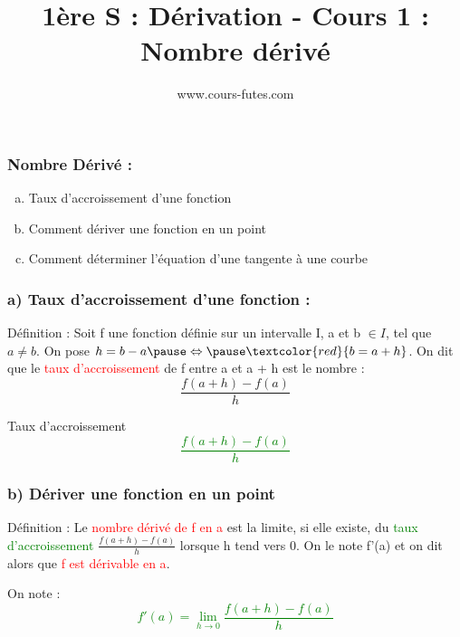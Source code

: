 \documentclass[t]{beamer}
\title{1ère S : Dérivation - Cours 1 : Nombre dérivé}
\author{www.cours-futes.com}
\institute{Sébastien Harinck}
\date{}
\begin{document}
\begin{frame}
\titlepage
\end{frame}

\begin{frame}[label=pagebanale]
\frametitle{Nombre Dérivé :}
\pause
\begin{enumerate}[a)]
\item<+-> Taux d'accroissement d'une fonction
\item<+-> Comment dériver une fonction en un point
\item<+-> Comment déterminer l'équation d'une tangente à une courbe
\end{enumerate}
\end{frame}

\begin{frame}[label=pagebanale]
\frametitle{a)  Taux d'accroissement d'une fonction : }
\pause
\begin{block}{Définition :}
\pause
Soit f une fonction définie sur un intervalle I, \pause a et b $ \in I$, \pause tel que $a \ne b$. \pause On pose $h = b - a \pause \Leftrightarrow \pause \textcolor{red}{ b = a + h}$. \pause
On dit que le \textcolor{red}{taux d'accroissement} de f \pause entre a et a + h \pause est le nombre : 
\pause
\[\frac{f(a+h) - f(a)}{h}\]
\pause
\end{block}
\begin{block}{Taux d'accroissement}
\pause
{\Huge \textcolor{green}{\[\frac{f(a+h) - f(a)}{h}\]}}
\end{block}
\end{frame}

\begin{frame}[label=pagebanale]
\frametitle{b) Dériver une fonction en un point}
\pause
\begin{block}{Définition :}
\pause
Le \textcolor{red}{nombre dérivé de f en a} est la limite, \pause si elle existe, \pause du \textcolor{green}{taux d'accroissement} \pause
\(\frac{f(a+h) - f(a)}{h}\)
\pause
lorsque h tend vers 0. \pause 
On le note f'(a) \pause  
et on dit alors que \textcolor{red}{f est dérivable en a}.
\pause
\end{block}
\begin{block}{On note :}
\pause
{\Huge \textcolor{green}{\[ f'(a) = \lim\limits_{h \rightarrow 0}\frac{f(a+h) - f(a)}{h}\]}}
\end{block}
\end{frame}
\end{document}
